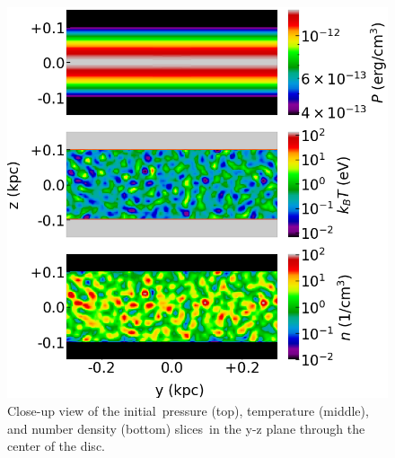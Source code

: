 \documentclass[twocolumn]{aastex631}
\begin{document}
  \begin{figure}
    \includegraphics[width=\columnwidth]{figures/fig__zoom-in-disc.png}
    \caption{Close-up view of the initial\
             pressure (top), temperature (middle), and number density (bottom) slices\
             in the y-z plane through the center of the disc.
             }
    \label{fig__zoom-in-disc}
  \end{figure}
\end{document}
